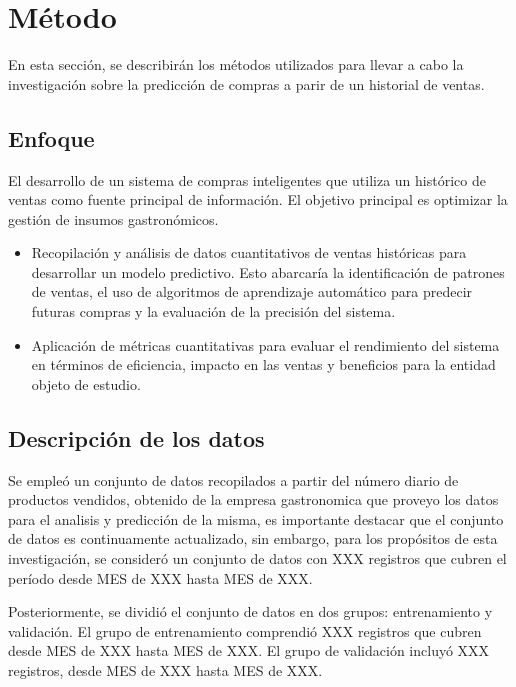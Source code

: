 \fancyhead{}
\fancyfoot{}
\cfoot{\thepage}



\chapter{Método}
En esta sección, se describirán los métodos utilizados para llevar a cabo la investigación sobre la predicción de compras a parir de un historial de ventas.


\section{Enfoque}
El desarrollo de un sistema de compras inteligentes que utiliza un histórico de ventas como fuente principal de información. El objetivo principal es optimizar la gestión de insumos gastronómicos.

\begin{itemize}
\item Recopilación y análisis de datos cuantitativos de ventas históricas para desarrollar un modelo predictivo. Esto abarcaría la identificación de patrones de ventas, el uso de algoritmos de aprendizaje automático para predecir futuras compras y la evaluación de la precisión del sistema. 
\item Aplicación de métricas cuantitativas para evaluar el rendimiento del sistema en términos de eficiencia, impacto en las ventas y beneficios para la entidad objeto de estudio.

\end{itemize}

\section{Descripción de los datos}
Se  empleó  un  conjunto  de  datos  recopilados  a  partir  del  número  diario  de  productos vendidos,  obtenido  de la empresa gastronomica que proveyo los datos para el analisis y predicción de la misma, es importante destacar que el conjunto de datos es continuamente actualizado, sin embargo, para los propósitos de esta investigación, se consideró un conjunto de datos con XXX registros que cubren el período desde MES de XXX hasta MES de XXX.

Posteriormente, se dividió el conjunto de datos en dos grupos: entrenamiento y validación. El grupo de entrenamiento comprendió XXX registros que cubren desde MES de XXX hasta MES de XXX. El grupo de validación incluyó XXX registros, desde MES de XXX hasta MES de XXX.



